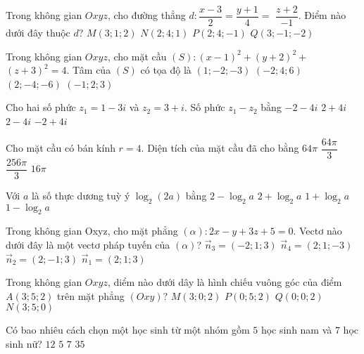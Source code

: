 \begin{ex}%
Trong không gian $O x y z$, cho đường thẳng $d\colon \dfrac{x-3}{2}=\dfrac{y+1}{4}=$ $\dfrac{z+2}{-1}$. Điểm nào dưới đây thuộc $d$?
\choice
{$M(3; 1; 2)$}
{$N(2; 4; 1)$}
{$P(2; 4;-1)$}
{\True $Q(3;-1;-2)$}

\end{ex}
\begin{ex}%
Trong không gian $O x y z$, cho mặt cầu $(S)\colon(x-1)^2+(y+2)^2+$ $(z+3)^2=4$. Tâm của $(S)$ có tọa độ là
\choice
{\True $(1;-2;-3)$}
{$(-2; 4; 6)$}
{$(2;-4;-6)$}
{$(-1; 2; 3)$}

\end{ex}
\begin{ex}%
Cho hai số phức $z_1=1-3 i$ và $z_2=3+i$. Số phức $z_1-z_2$ bằng
\choice
{\True $-2-4 i$}
{$2+4 i$}
{$2-4 i$}
{$-2+4 i$}

\end{ex}
\begin{ex}%
Cho mặt cầu có bán kính $r=4$. Diện tích của mặt cầu đã cho bằng
\choice
{\True $64\pi$}
{$\dfrac{64\pi}{3}$}
{$\dfrac{256\pi}{3}$}
{$16\pi$}

\end{ex}
\begin{ex}%
Với $a$ là số thực dương tuỳ ý $\log_2(2 a)$ bằng
\choice
{$2-\log_2 a$}
{$2+\log_2 a$}
{\True $1+\log_2 a$}
{$1-\log_2 a$}

\end{ex}
\begin{ex}%
Trong không gian Oxyz, cho mặt phẳng $(\alpha)\colon 2 x-y+3 z+5=0$. Vectơ nào dưới đây là một vectơ pháp tuyến của $(\alpha)$?
\choice
{$\vec{n}_3=(-2; 1; 3)$}
{$\vec{n}_4=(2; 1;-3)$}
{\True $\vec{n}_2=(2;-1; 3)$}
{$\vec{n}_1=(2; 1; 3)$}

\end{ex}
\begin{ex}%
Trong không gian $O x y z$, diểm nào dưới dây là hình chiếu vuông góc của điểm $A(3; 5; 2)$ trên mặt phẳng $(Oxy)$?
\choice
{$M(3; 0; 2)$}
{$P(0; 5; 2)$}
{$Q(0; 0; 2)$}
{\True $N(3; 5; 0)$}

\end{ex}
\begin{ex}%
Có bao nhiêu cách chọn một học sinh từ một nhóm gồm $5$ học sinh nam và $7$ học sinh nữ?
\choice
{\True $12$}
{$5$}
{$7$}
{$35$}

\end{ex}
